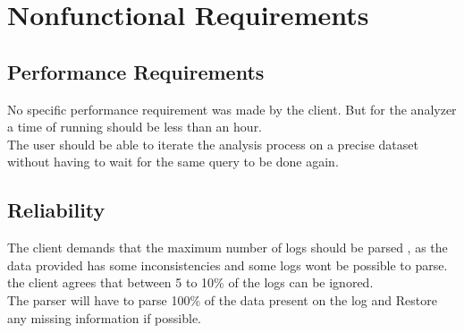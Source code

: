 \documentclass{scrreprt}
\begin{document}
\chapter{Nonfunctional Requirements}
\section{Performance Requirements}
No specific performance requirement was made by the client. But for the analyzer
a time of running should be less than an hour.\\
The user should be able to iterate the analysis process on a precise dataset without having to wait for the same query to be done again.


\section{Reliability}
The client demands that the maximum number of logs should be parsed , as the
data provided has some inconsistencies and some logs wont be possible to parse.
the client agrees that between 5 to 10\% of the logs can be ignored.\\

The parser will have to parse 100\% of the data present on the log and Restore
any missing information if possible.\\
\end{document}
